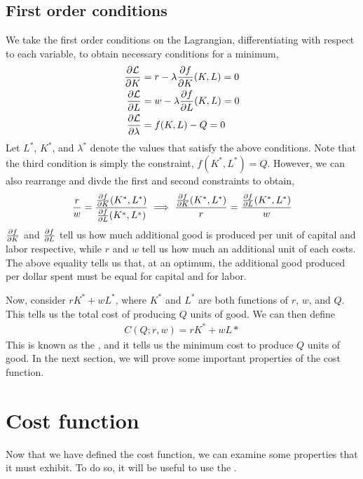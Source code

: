 \subsection*{First order conditions}
We take the first order conditions on the Lagrangian, differentiating with respect to each variable, to obtain necessary conditions for a minimum, 
\begin{align*}
    \frac{\partial \mathcal{L}}{\partial K} &= r - \lambda \frac{\partial f}{\partial K}(K, L) = 0 \\
    \frac{\partial \mathcal{L}}{\partial L} &= w - \lambda \frac{\partial f}{\partial L}(K, L) = 0 \\
    \frac{\partial \mathcal{L}}{\partial \lambda} &= f(K, L) - Q = 0
\end{align*}
Let $L^*$, $K^*$, and $\lambda^*$ denote the values that satisfy the above conditions. Note that the third condition is simply the constraint, $f(K^*, L^*) = Q$. However, we can also rearrange and divde the first and second constraints to obtain,
\begin{align}
    \frac{r}{w} = \frac{\frac{\partial f}{\partial K}(K^*, L^*)}{\frac{\partial f}{\partial L}(K^*, L^*)} \implies \frac{\frac{\partial f}{\partial K}(K^*, L^*)}{r} = \frac{\frac{\partial f}{\partial L}(K^*, L^*)}{w} \label{eq:marginal_cost_equal}
\end{align}
$\frac{\partial f}{\partial K}$ and $\frac{\partial f}{\partial L}$ tell us how much additional good is produced per unit of capital and labor respective, while $r$ and $w$ tell us how much an additional unit of each costs. The above equality tells us that, at an optimum, the additional good produced per dollar spent must be equal for capital and for labor. 

Now, consider $rK^* + wL^*$, where $K^*$ and $L^*$ are both functions of $r$, $w$, and $Q$. This tells us the total cost of producing $Q$ units of good. We can then define 
\begin{align*}
    C(Q; r, w) = rK^* + wL*
\end{align*}
This is known as the , and it tells us the minimum cost to produce $Q$ units of good. In the next section, we will prove some important properties of the cost function. 


\section{Cost function}
Now that we have defined the cost function, we can examine some properties that it must exhibit. To do so, it will be useful to use the .

